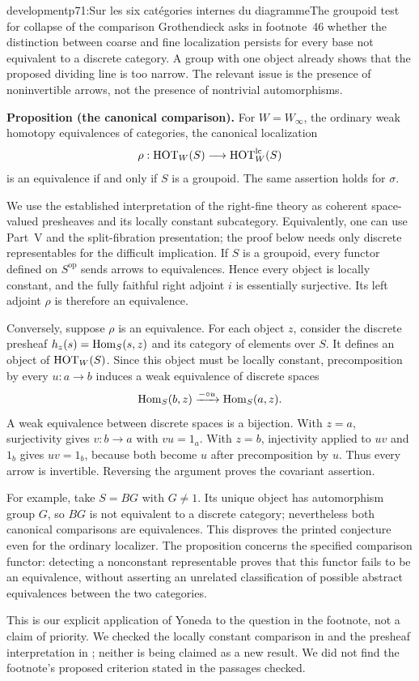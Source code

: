 \begin{dcomment}{development}{p71:Sur les six catégories internes du diagramme}{The groupoid test for collapse of the comparison}
Grothendieck asks in footnote~46 whether the distinction between coarse and fine localization persists for every base not equivalent to a discrete category. A group with one object already shows that the proposed dividing line is too narrow. The relevant issue is the presence of noninvertible arrows, not the presence of nontrivial automorphisms.

\textbf{Proposition (the canonical comparison).}\ours
For $W=W_\infty$, the ordinary weak homotopy equivalences of categories, the canonical localization
\[
 \rho:\mathrm{HOT}_W(S)\longrightarrow\mathrm{HOT}_W^{\mathrm{lc}}(S)
\]
is an equivalence if and only if $S$ is a groupoid. The same assertion holds for $\sigma$.

We use the established interpretation of the right-fine theory as coherent space-valued presheaves and its locally constant subcategory. Equivalently, one can use Part~V and the split-fibration presentation; the proof below needs only discrete representables for the difficult implication. If $S$ is a groupoid, every functor defined on $S^{\mathrm{op}}$ sends arrows to equivalences. Hence every object is locally constant, and the fully faithful right adjoint $i$ is essentially surjective. Its left adjoint $\rho$ is therefore an equivalence.

Conversely, suppose $\rho$ is an equivalence. For each object $z$, consider the discrete presheaf $h_z(s)=\operatorname{Hom}_S(s,z)$ and its category of elements over $S$. It defines an object of $\mathrm{HOT}_W(S)$. Since this object must be locally constant, precomposition by every $u:a\to b$ induces a weak equivalence of discrete spaces
\[
 \operatorname{Hom}_S(b,z)\xrightarrow{-\circ u}\operatorname{Hom}_S(a,z).
\]
A weak equivalence between discrete spaces is a bijection. With $z=a$, surjectivity gives $v:b\to a$ with $vu=1_a$. With $z=b$, injectivity applied to $uv$ and $1_b$ gives $uv=1_b$, because both become $u$ after precomposition by $u$. Thus every arrow is invertible. Reversing the argument proves the covariant assertion.

For example, take $S=BG$ with $G\ne1$. Its unique object has automorphism group $G$, so $BG$ is not equivalent to a discrete category; nevertheless both canonical comparisons are equivalences. This disproves the printed conjecture even for the ordinary localizer. The proposition concerns the specified comparison functor: detecting a nonconstant representable proves that this functor fails to be an equivalence, without asserting an unrelated classification of possible abstract equivalences between the two categories.

This is our explicit application of Yoneda to the question in the footnote, not a claim of priority. We checked the locally constant comparison in \citet[\S\S1--2]{Cisinski2009LocallyConstant} and the presheaf interpretation in \citet[Theorem~2.2.1.2]{Lurie2009HTT}; neither is being claimed as a new result. We did not find the footnote's proposed criterion stated in the passages checked.
\end{dcomment}


